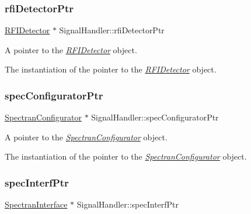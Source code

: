 \subsubsection{\texorpdfstring{rfi\+Detector\+Ptr}{rfiDetectorPtr}}
{\footnotesize\ttfamily \hyperlink{classRFIDetector}{R\+F\+I\+Detector} $\ast$ Signal\+Handler\+::rfi\+Detector\+Ptr\hspace{0.3cm}{\ttfamily [static]}}



A pointer to the {\itshape \hyperlink{classRFIDetector}{R\+F\+I\+Detector}} object. 

The instantiation of the pointer to the {\itshape \hyperlink{classRFIDetector}{R\+F\+I\+Detector}} object. \mbox{\label{classSignalHandler_a0b9c75b3e3c928c01cc5e44d42e5ac38}} 
\subsubsection{\texorpdfstring{spec\+Configurator\+Ptr}{specConfiguratorPtr}}
{\footnotesize\ttfamily \hyperlink{classSpectranConfigurator}{Spectran\+Configurator} $\ast$ Signal\+Handler\+::spec\+Configurator\+Ptr\hspace{0.3cm}{\ttfamily [static]}}



A pointer to the {\itshape \hyperlink{classSpectranConfigurator}{Spectran\+Configurator}} object. 

The instantiation of the pointer to the {\itshape \hyperlink{classSpectranConfigurator}{Spectran\+Configurator}} object. \mbox{\label{classSignalHandler_a855d0b79fcbacf50e4a1d12bd5d1bf53}} 
\subsubsection{\texorpdfstring{spec\+Interf\+Ptr}{specInterfPtr}}
{\footnotesize\ttfamily \hyperlink{classSpectranInterface}{Spectran\+Interface} $\ast$ Signal\+Handler\+::spec\+Interf\+Ptr\hspace{0.3cm}{\ttfamily [static]}}



